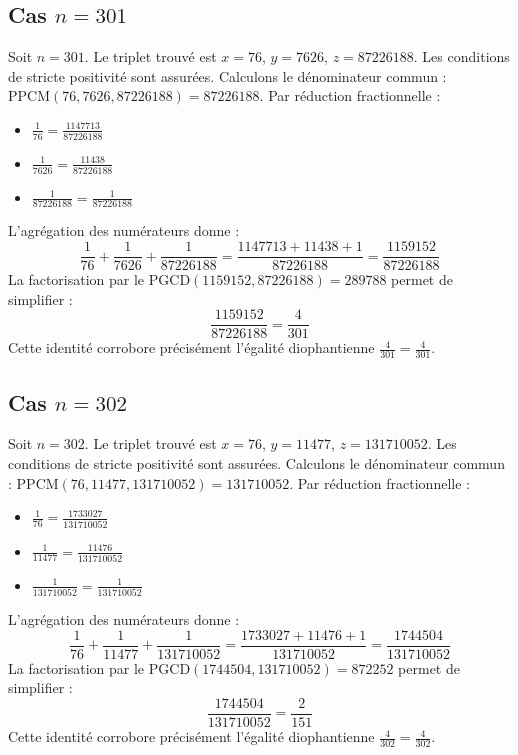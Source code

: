 \documentclass[11pt,a4paper]{article}
\begin{document}
\subsection{Cas $n = 301$}
Soit $n = 301$. Le triplet trouvé est $x = 76$, $y = 7626$, $z = 87226188$.
Les conditions de stricte positivité sont assurées.
Calculons le dénominateur commun : $\text{PPCM}(76, 7626, 87226188) = 87226188$.
Par réduction fractionnelle :
\begin{itemize}
    \item $\frac{1}{76} = \frac{1147713}{87226188}$
    \item $\frac{1}{7626} = \frac{11438}{87226188}$
    \item $\frac{1}{87226188} = \frac{1}{87226188}$
\end{itemize}
L'agrégation des numérateurs donne :
$$ \frac{1}{76} + \frac{1}{7626} + \frac{1}{87226188} = \frac{1147713 + 11438 + 1}{87226188} = \frac{1159152}{87226188} $$
La factorisation par le $\text{PGCD}(1159152, 87226188) = 289788$ permet de simplifier :
$$ \frac{1159152}{87226188} = \frac{4}{301} $$
Cette identité corrobore précisément l'égalité diophantienne $\frac{4}{301} = \frac{4}{301}$.

\subsection{Cas $n = 302$}
Soit $n = 302$. Le triplet trouvé est $x = 76$, $y = 11477$, $z = 131710052$.
Les conditions de stricte positivité sont assurées.
Calculons le dénominateur commun : $\text{PPCM}(76, 11477, 131710052) = 131710052$.
Par réduction fractionnelle :
\begin{itemize}
    \item $\frac{1}{76} = \frac{1733027}{131710052}$
    \item $\frac{1}{11477} = \frac{11476}{131710052}$
    \item $\frac{1}{131710052} = \frac{1}{131710052}$
\end{itemize}
L'agrégation des numérateurs donne :
$$ \frac{1}{76} + \frac{1}{11477} + \frac{1}{131710052} = \frac{1733027 + 11476 + 1}{131710052} = \frac{1744504}{131710052} $$
La factorisation par le $\text{PGCD}(1744504, 131710052) = 872252$ permet de simplifier :
$$ \frac{1744504}{131710052} = \frac{2}{151} $$
Cette identité corrobore précisément l'égalité diophantienne $\frac{4}{302} = \frac{4}{302}$.
\end{document}
